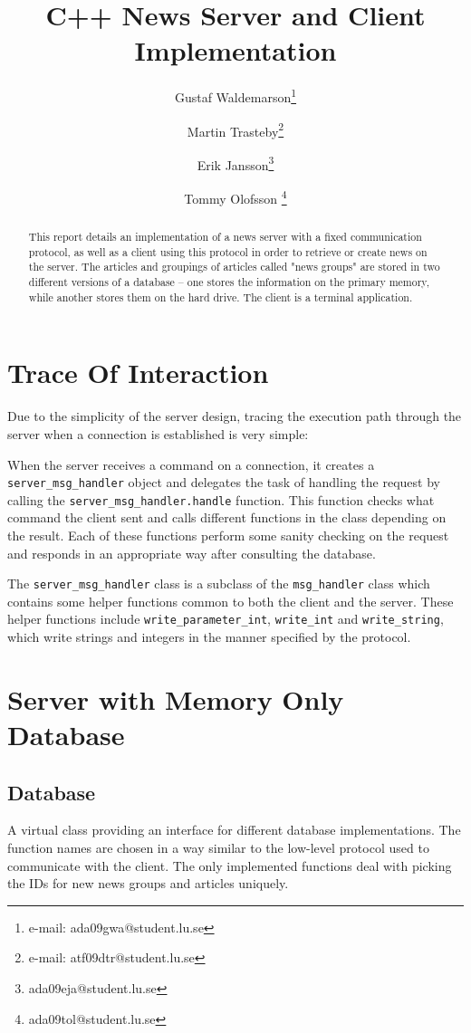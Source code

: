\documentclass{acmsiggraph}               %
\title{C++ News Server and Client Implementation}
\author{Gustaf Waldemarson\thanks{e-mail: ada09gwa@student.lu.se}
\and Martin Trasteby\thanks{e-mail: atf09dtr@student.lu.se}
\and Erik Jansson\thanks{ada09eja@student.lu.se}
\and Tommy Olofsson \thanks{ada09tol@student.lu.se}}
\affiliation{Faculty of Engineering (LTH), Lund University \\ Sweden}
\begin{document}
\ifpdf
\else
\fi




\begin{abstract}
This report details an implementation of a news server with a fixed
communication protocol, as well as a client using this protocol in
order to retrieve or create news on the server. The articles and
groupings of articles called "news groups" are stored in two different
versions of a database -- one stores the information on the primary
memory, while another stores them on the hard drive. The client is a
terminal application.

\end{abstract}
\keywordlist

\section{Trace Of Interaction}
Due to the simplicity of the server design, tracing the execution path through
the server when a connection is established is very simple:

When the server receives a command on a connection, it creates a
\verb|server_msg_handler| object and delegates the task of handling the request
by calling the \verb|server_msg_handler.handle| function. This function checks
what command the client sent and calls different functions in the class
depending on the result.  Each of these functions perform some sanity checking
on the request and responds in an appropriate way after consulting the database.

The \verb|server_msg_handler| class is a subclass of the \verb|msg_handler|
class which contains some helper functions common to both the client and the
server. These helper functions include \verb|write_parameter_int|,
\verb|write_int| and \verb|write_string|, which write strings and integers in
the manner specified by the protocol.

\section{Server with Memory Only Database}
\label{sec:smemdb}

\subsection{Database}
\label{ssec:database}
A virtual class providing an interface for different database implementations. The function names
are chosen in a way similar to the low-level protocol used to communicate with the client. The only 
implemented functions deal with picking the IDs for new news groups and articles uniquely. 
\end{document}
